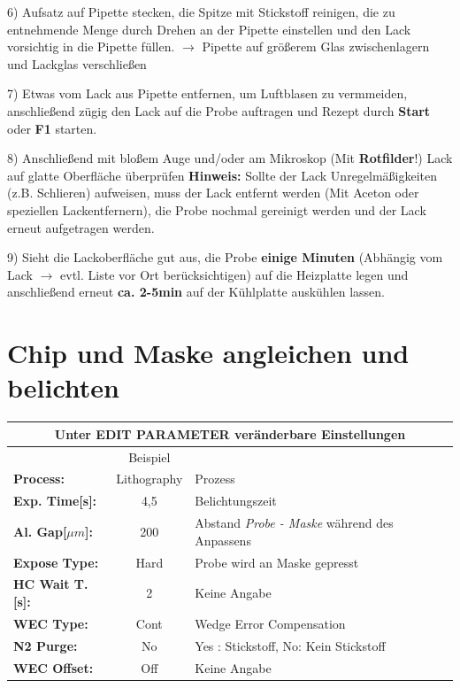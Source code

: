 \documentclass[
  ngerman,
  twoside,
  captions=tableheading,
  BCOR=.5cm,
  fontsize=11,
  ]{scrreprt}
\begin{document}
\begin{description}
\begin{description}
\end{description}

\item 6) Aufsatz auf Pipette stecken, die Spitze mit Stickstoff reinigen, die zu entnehmende Menge durch Drehen an der Pipette einstellen und den Lack vorsichtig in die Pipette füllen. $\rightarrow$ Pipette auf größerem Glas zwischenlagern und Lackglas verschließen

\item 7) Etwas vom Lack aus Pipette entfernen, um Luftblasen zu vermmeiden, anschließend zügig den Lack auf die Probe auftragen und Rezept durch \textbf{Start} oder \textbf{F1} starten.

\item 8) Anschließend mit bloßem Auge und/oder am Mikroskop (Mit \textbf{Rotfilder}!) Lack auf glatte Oberfläche überprüfen\newline
\textbf{Hinweis:} Sollte der Lack Unregelmäßigkeiten (z.B. Schlieren) aufweisen, muss der Lack entfernt werden (Mit Aceton oder speziellen Lackentfernern), die Probe nochmal gereinigt werden und der Lack erneut aufgetragen werden.

\item 9) Sieht die Lackoberfläche gut aus, die Probe \textbf{einige Minuten} (Abhängig vom Lack $\rightarrow$ evtl. Liste vor Ort berücksichtigen) auf die Heizplatte legen und anschließend erneut \textbf{ca. 2-5min} auf der Kühlplatte auskühlen lassen.

\end{description}

\newpage

\chapter{Chip und Maske angleichen und belichten}
\begin{center}
\begin{tabular}{| l | c | l |}
\multicolumn{3}{c}{Unter \textbf{EDIT PARAMETER} veränderbare Einstellungen}\\ \hline
& Beispiel & \\ \hline
\textbf{Process:}  & Lithography & Prozess\\ \hline
\textbf{Exp. Time[s]:} & 4,5 & Belichtungszeit\\ \hline
\textbf{Al. Gap[$\mu m$]:} & 200 & Abstand \textit{Probe - Maske} 
während des Anpassens\\ \hline
\textbf{Expose Type:} & Hard & Probe wird an Maske gepresst\\ \hline
\textbf{HC Wait T.[s]:} & 2 & Keine Angabe\\ \hline
\textbf{WEC Type:} & Cont & Wedge Error Compensation\\ \hline
\textbf{N2 Purge:} & No & Yes : Stickstoff, No: Kein Stickstoff\\ \hline
\textbf{WEC Offset:} & Off & Keine Angabe\\ \hline
\end{tabular}
\end{center}
\end{document}
